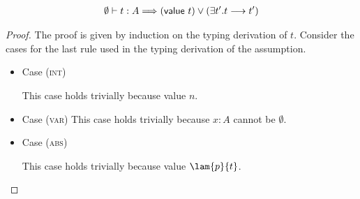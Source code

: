 
\begin{theorem}
\label{lemma:progress}
\begin{align*}
    \emptyset \vdash t:A \Longrightarrow
    (\textnormal{\textsf{value}}\ t) \lor (\exists t'. t \longrightarrow t')
\end{align*}
\end{theorem}

\begin{proof}
The proof is given by induction on the typing derivation of $t$.
Consider the cases for the last rule used in the typing derivation of the assumption.
\\

\begin{itemize}
\item Case (\textsc{int})
\begin{center}
    \begin{minipage}{.25\linewidth}
    \end{minipage}
\end{center}
This case holds trivially because \textsf{value} $n$.
\\

\item Case (\textsc{var})
This case holds trivially because $x:A$ cannot be $\emptyset$.
\\

\item Case (\textsc{abs})
\begin{center}
    \begin{minipage}{.55\linewidth}
    \end{minipage}
\end{center}
This case holds trivially because \textsf{value} $\lam{p}{t}$.
\\


\end{itemize}
\end{proof}
